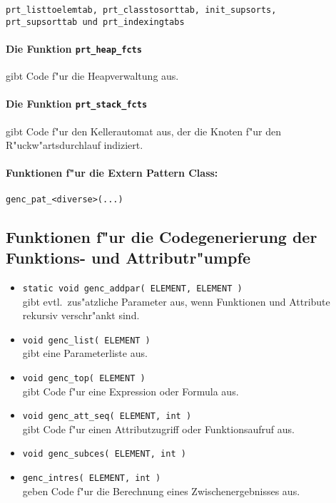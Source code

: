 {\tt prt\_listtoelemtab,
prt\_classtosorttab,
init\_supsorts,\\
prt\_supsorttab {\rm und}
prt\_indexingtabs
}

\paragraph{Die Funktion {\tt prt\_heap\_fcts}} gibt Code f"ur die Heapverwaltung aus.


\paragraph{Die Funktion {\tt prt\_stack\_fcts}} gibt Code f"ur den Kellerautomat aus,
der die Knoten f"ur den R"uckw"artsdurchlauf indiziert.

\paragraph{Funktionen f"ur die Extern Pattern Class:}
{\tt genc\_pat\_<diverse>(...)}


\subsection{Funktionen f"ur die Codegenerierung der Funktions- und Attributr"umpfe}

\begin{itemize}
\item {\tt static void genc\_addpar( ELEMENT, ELEMENT )}\\
gibt evtl.\ zus"atzliche Parameter aus, wenn Funktionen und Attribute
rekursiv verschr"ankt sind.

\item {\tt void  genc\_list( ELEMENT )}\\
gibt eine Parameterliste aus.

\item {\tt void  genc\_top( ELEMENT )}\\
gibt Code f"ur eine Expression oder Formula aus.

\item {\tt void  genc\_att\_seq( ELEMENT, int )}\\
gibt Code f"ur einen Attributzugriff oder Funktionsaufruf aus.

\item {\tt void  genc\_subces( ELEMENT, int )}
\item {\tt genc\_intres( ELEMENT, int )}\\
geben Code f"ur die Berechnung eines Zwischenergebnisses aus.
\end{itemize}

